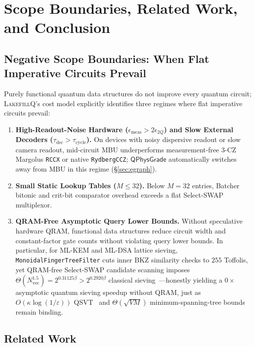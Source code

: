 \documentclass[acmsmall,screen,anonymous]{acmart}
\DeclareRobustCommand{\_}{\ifmmode\text{\char95}\else\char95\penalty0\relax\fi}
\theoremstyle{plain}
\newcommand{\LakefillQ}{\textsc{LakefillQ}}
\newcommand{\QPhysGrade}{\ensuremath{\mathsf{QPhysGrade}}}
\begin{document}
\section{Scope Boundaries, Related Work, and Conclusion}
\label{sec:related}

\subsection{Negative Scope Boundaries: When Flat Imperative Circuits Prevail}
\label{sec:scope}

Purely functional quantum data structures do not improve every quantum circuit; \LakefillQ{}'s cost model explicitly identifies three regimes where flat imperative circuits prevail:
\begin{enumerate}
  \item \textbf{High-Readout-Noise Hardware ($\epsilon_{\mathrm{meas}} > 2 \epsilon_{2Q}$) and Slow External Decoders ($\tau_{\mathrm{dec}} > \tau_{\mathrm{cycle}}$).} On devices with noisy dispersive readout or slow camera readout, mid-circuit MBU underperforms measurement-free $3$-CZ Margolus \texttt{RCCX} or native \texttt{RydbergCCZ}; $\QPhysGrade$ automatically switches away from MBU in this regime (\S\ref{sec:egraph}).
  \item \textbf{Small Static Lookup Tables ($M \le 32$).} Below $M = 32$ entries, Batcher bitonic and crit-bit comparator overhead exceeds a flat Select-SWAP multiplexor.
  \item \textbf{QRAM-Free Asymptotic Query Lower Bounds.} Without speculative hardware QRAM, functional data structures reduce circuit width and constant-factor gate counts without violating query lower bounds. In particular, for ML-KEM and ML-DSA lattice sieving, \texttt{MonoidalFingerTreeFilter} cuts inner BKZ similarity checks to $255$ Toffolis, yet QRAM-free Select-SWAP candidate scanning imposes $\Theta(N_{\mathrm{vec}}^{1.5}) = 2^{0.31125\beta} > 2^{0.2920\beta}$ classical sieving~\cite{becker2016,jaquesschanck2019,chailloux2021}---honestly yielding a $0\times$ asymptotic quantum sieving speedup without QRAM, just as $O(\kappa \log(1/\varepsilon))$ QSVT~\cite{gilyen2019} and $\Theta(\sqrt{V M})$ minimum-spanning-tree bounds remain binding.
\end{enumerate}

\subsection{Related Work}
\label{sec:relwork}
\end{document}
